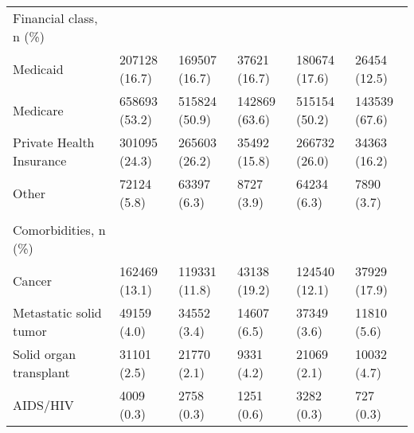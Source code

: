 \begin{adjustbox}{width={\textwidth},totalheight={\textheight},keepaspectratio,frame}
{\begin{tabular}{L{20em}C{10em}C{10em}C{10em}C{10em}C{10em}}
Financial class, n (\%) &                 &                            &                        &                             &                        \\
\hspace{3mm}                   Medicaid &      207128 (16.7) &                 169507 (16.7) &              37621 (16.7) &                  180674 (17.6) &              26454 (12.5) \\
\hspace{3mm}                   Medicare &      658693 (53.2) &                 515824 (50.9) &             142869 (63.6) &                  515154 (50.2) &             143539 (67.6) \\
\hspace{3mm}   Private Health Insurance &      301095 (24.3) &                 265603 (26.2) &              35492 (15.8) &                  266732 (26.0) &              34363 (16.2) \\
\hspace{3mm}                      Other &        72124 (5.8) &                   63397 (6.3) &                8727 (3.9) &                    64234 (6.3) &                7890 (3.7) \\
&                 &                            &                        &                             &                        \\
Comorbidities, n (\%) &                 &                            &                        &                             &                        \\
\hspace{3mm}                     Cancer &      162469 (13.1) &                 119331 (11.8) &              43138 (19.2) &                  124540 (12.1) &              37929 (17.9) \\
\hspace{3mm}     Metastatic solid tumor &        49159 (4.0) &                   34552 (3.4) &               14607 (6.5) &                    37349 (3.6) &               11810 (5.6) \\
\hspace{3mm}     Solid organ transplant &        31101 (2.5) &                   21770 (2.1) &                9331 (4.2) &                    21069 (2.1) &               10032 (4.7) \\
\hspace{3mm}                   AIDS/HIV &         4009 (0.3) &                    2758 (0.3) &                1251 (0.6) &                     3282 (0.3) &                 727 (0.3) \\

\end{tabular}}
\end{adjustbox}

